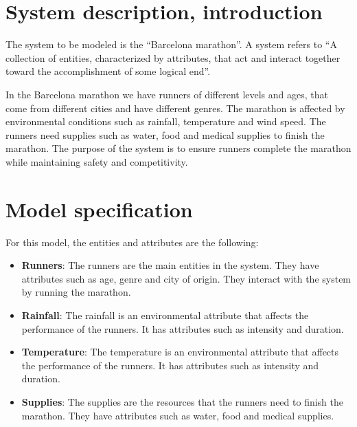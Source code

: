 \documentclass[conference]{IEEEtran}
\begin{document}
% 
\section{System description, introduction}
The system to be modeled is the ``Barcelona marathon''. A system refers to ``A collection of entities, characterized by attributes, that act and interact together toward the accomplishment of some logical end''. 

In the Barcelona marathon we have runners of different levels and ages, that come from different cities and have different genres. The marathon is affected by environmental conditions such as rainfall, temperature and wind speed. The runners need supplies such as water, food and medical supplies to finish the marathon. The purpose of the system is to ensure runners complete the marathon  while maintaining safety and competitivity. 


\section{Model specification}

For this model, the entities and attributes are the following:

\begin{itemize}
    \item \textbf{Runners}: The runners are the main entities in the system. They have attributes such as age, genre and city of origin. They interact with the system by running the marathon.
    \item \textbf{Rainfall}: The rainfall is an environmental attribute that affects the performance of the runners. It has attributes such as intensity and duration.
    \item \textbf{Temperature}: The temperature is an environmental attribute that affects the performance of the runners. It has attributes such as intensity and duration.
    \item \textbf{Supplies}: The supplies are the resources that the runners need to finish the marathon. They have attributes such as water, food and medical supplies.
\end{itemize}
\end{document}
